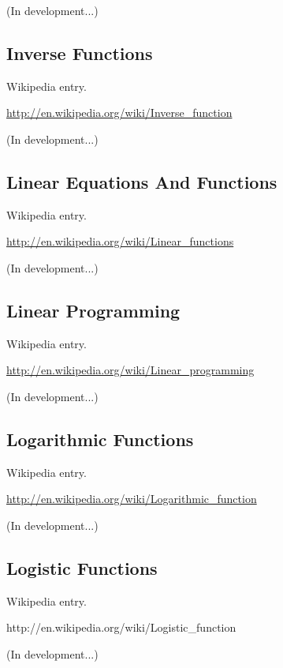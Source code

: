 \documentclass[12pt,oneside]{book}
\begin{document}
(In development...)

\subsection[Inverse Functions]{Inverse Functions}

Wikipedia entry.

\href{http://en.wikipedia.org/wiki/Inverse_function}{http://en.wikipedia.org/wiki/Inverse\_function}

(In development...)

\subsection[Linear Equations And Functions]{Linear Equations And Functions}

Wikipedia entry.

\href{http://en.wikipedia.org/wiki/Linear_functions}{http://en.wikipedia.org/wiki/Linear\_functions}

(In development...)

\subsection[Linear Programming]{Linear Programming}

Wikipedia entry.

\href{http://en.wikipedia.org/wiki/Linear_programming}{http://en.wikipedia.org/wiki/Linear\_programming}

(In development...)

\subsection[Logarithmic Functions]{Logarithmic Functions}

Wikipedia entry.

\href{http://en.wikipedia.org/wiki/Logarithmic_function}{http://en.wikipedia.org/wiki/Logarithmic\_function}

(In development...)

\subsection[Logistic Functions]{Logistic Functions}

Wikipedia entry.

http://en.wikipedia.org/wiki/Logistic\_function

(In development...)
\end{document}
